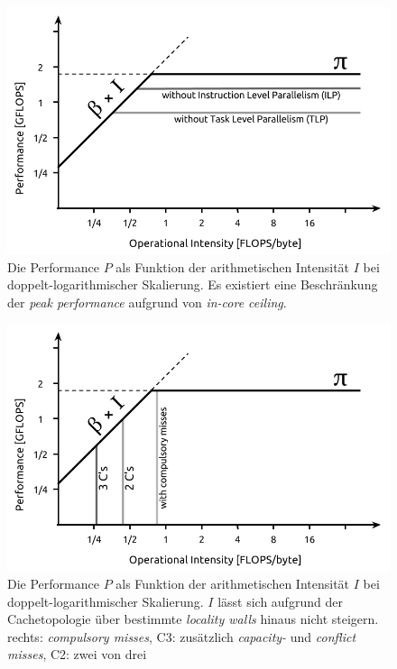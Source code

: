 		\begin{figure}[t]
		\centering
	    	\includegraphics[height=0.35\textheight]{chapter1/pictures/roofline_model_2.png}
    		\caption[Roofline Modell - \textit{in-core ceiling}]{Die Performance $P$ als Funktion der arithmetischen Intensität $I$ bei doppelt-logarithmischer Skalierung. Es existiert eine Beschränkung der \textit{peak performance} aufgrund von \textit{in-core ceiling}. \autocite{wikiRLM}}
    		\label{1:rl2}
		\end{figure}

		\begin{figure}[b]
		\centering
    		\includegraphics[height=0.35\textheight]{chapter1/pictures/roofline_model_3.png}
	    	\caption[Roofline Modell - \textit{locality walls}]{Die Performance $P$ als Funktion der arithmetischen Intensität $I$ bei doppelt-logarithmischer Skalierung. $I$ lässt sich aufgrund der Cachetopologie über bestimmte \textit{locality walls} hinaus nicht steigern. rechts: \textit{compulsory misses}, C3: zusätzlich \textit{capacity-} und \textit{conflict misses}, C2: zwei von drei \autocite{wikiRLM}}
    		\label{1:rl3}
		\end{figure}
		
